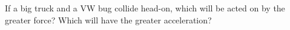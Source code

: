 If a big truck and a VW bug collide head-on, which will
        be acted on by the greater force? Which will have the
        greater acceleration?
